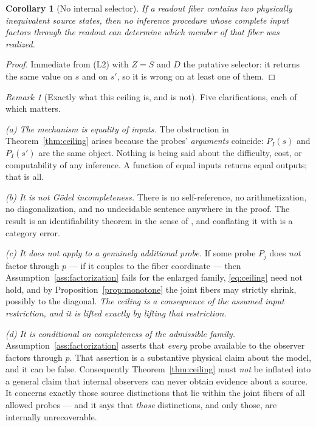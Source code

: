 \documentclass[11pt,reqno]{amsart}
\theoremstyle{plain}
\newtheorem{corollary}[theorem]{Corollary}
\theoremstyle{definition}
\theoremstyle{remark}
\newtheorem{remark}[theorem]{Remark}
\begin{document}
\begin{corollary}[No internal selector]\label{cor:noselector}
If a readout fiber contains two physically inequivalent source states, then no inference procedure whose complete input factors through the readout can determine which member of that fiber was realized.
\end{corollary}

\begin{proof}
Immediate from (L2) with $Z=S$ and $D$ the putative selector: it returns the same value on $s$ and on $s'$, so it is wrong on at least one of them.
\end{proof}

\begin{remark}[Exactly what this ceiling is, and is not]\label{rem:ceilingscope}
Five clarifications, each of which matters.

\emph{(a) The mechanism is equality of inputs.} The obstruction in Theorem~\ref{thm:ceiling} arises because the probes' \emph{arguments} coincide: $P_I(s)$ and $P_I(s')$ are the same object. Nothing is being said about the difficulty, cost, or computability of any inference. A function of equal inputs returns equal outputs; that is all.

\emph{(b) It is not G\"odel incompleteness.} There is no self-reference, no arithmetization, no diagonalization, and no undecidable sentence anywhere in the proof. The result is an identifiability theorem in the sense of \cite{LeCam1964,Lehmann}, and conflating it with \cite{Goedel1931} is a category error.

\emph{(c) It does not apply to a genuinely additional probe.} If some probe $P_j$ does \emph{not} factor through $p$ --- if it couples to the fiber coordinate --- then Assumption~\ref{ass:factorization} fails for the enlarged family, \eqref{eq:ceiling} need not hold, and by Proposition~\ref{prop:monotone} the joint fibers may strictly shrink, possibly to the diagonal. \emph{The ceiling is a consequence of the assumed input restriction, and it is lifted exactly by lifting that restriction.}

\emph{(d) It is conditional on completeness of the admissible family.} Assumption~\ref{ass:factorization} asserts that \emph{every} probe available to the observer factors through $p$. That assertion is a substantive physical claim about the model, and it can be false. Consequently Theorem~\ref{thm:ceiling} must \emph{not} be inflated into a general claim that internal observers can never obtain evidence about a source. It concerns exactly those source distinctions that lie within the joint fibers of all allowed probes --- and it says that \emph{those} distinctions, and only those, are internally unrecoverable.


\end{remark}
\end{document}
